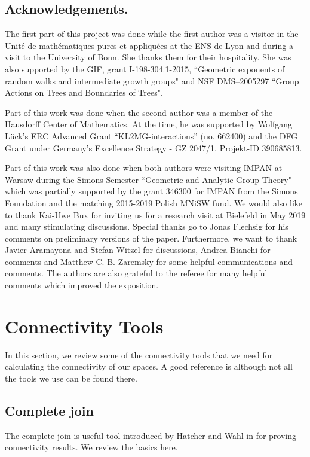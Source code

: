 \documentclass[11pt, a4paper]{amsart}
\theoremstyle{definition}
\begin{document}
\subsection*{Acknowledgements.}  
The first part of this project was done while the first author was a visitor in the Unit\'{e} de math\'{e}matiques pures et appliqu\'{e}es at the ENS de Lyon and during a visit to the University of Bonn. She thanks them for their hospitality. She was also supported by the GIF, grant I-198-304.1-2015, ``Geometric exponents of random walks and intermediate growth groups" and NSF DMS--2005297 ``Group Actions on Trees and Boundaries of Trees".

Part of this work was done when the second author was a member of the  Hausdorff Center of Mathematics. At the time, he was  supported by Wolfgang L\"uck's ERC Advanced Grant “KL2MG-interactions”
(no. 662400) and the DFG Grant under Germany's Excellence Strategy - GZ 2047/1, Projekt-ID 390685813.

Part of this work was also done when both authors were visiting IMPAN at Warsaw during the Simons Semester ``Geometric and Analytic Group Theory" which was partially supported by the grant 346300 for IMPAN from the Simons Foundation and the matching 2015-2019 Polish MNiSW fund. We would also like to thank Kai-Uwe Bux for inviting us for a research visit at Bielefeld in May 2019 and many stimulating discussions. Special thanks go to Jonas Flechsig for his comments on preliminary versions of the paper. Furthermore, we want to thank Javier Aramayona and Stefan Witzel for discussions, Andrea Bianchi for comments and Matthew C. B. Zaremsky for some helpful communications and comments. The authors are also grateful to the referee for many helpful comments which improved the exposition. 



\section{Connectivity Tools}\label{sec:connectivitytools}
In this section, we review some of the connectivity tools that we need for calculating the connectivity of our spaces. A good reference is \cite[Section 2]{HV17} although not all the tools we use can be found there.




\subsection{Complete join}\label{subsec-com-join} The complete join is useful tool introduced by Hatcher and Wahl in \cite[Section 3]{HW10} for proving connectivity results. We review the basics here.
\end{document}
